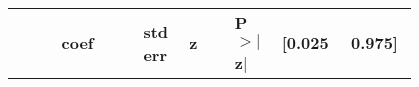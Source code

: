 \begin{center}
	\begin{longtable}{p{0.1\linewidth}p{0.18\linewidth}p{0.1\linewidth}p{0.1\linewidth}p{0.1\linewidth}p{0.12\linewidth}p{0.1\linewidth}}
		\midrule
		            & \textbf{coef} & \textbf{std err} & \textbf{z} & \textbf{P$> |$z$|$} & \textbf{[0.025} & \textbf{0.975]} \\

\end{longtable}
\end{center}
